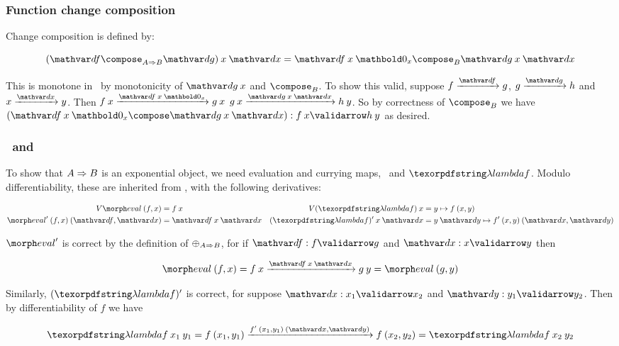 \subsubsection{Function change composition}

Change composition is defined by:

\nopagebreak[2]
\[ (\df \compose_{\expO A B} \dg) \<x \<\dx = \df \<x \<\zero_x \compose_B \dg \<x \<\dx\]

\noindent
This is monotone in \dx\ by monotonicity of $\dg\<x$ and $\composefn_B$. To show
this valid, suppose $\vld\df f g$, $\vld\dg g h$ and $\vld\dx x y$. Then
%
\(\vld{\df\<x\<\zero_x}{f\<x}{g\<x}\)
\(\vld{\dg\<x\<\dx}{g\<x}{h\<y} \).
%
\noindent So by correctness of $\composefn_B$ we have \(\valid{(\df\<x\<\zero_x
  \compose \dg\<x\<\dx)}{f\<x}{h\<y}\) as desired.


\subsubsection{\eval\ and \fn}

To show that $A \Rightarrow B$ is an exponential object, we need evaluation and
currying maps, \eval\ and $\fn f$. Modulo differentiability, these are
inherited from \Poset{}, with the following derivatives:

\begin{align*}
  \vals{\eval} \<(f,x) &= f\<x &
  \vals{(\fn f)} \<x &= y \mapsto f\<(x,y)\\
  \deriv{\eval} \<(f,x) \<(\df,\dx) &= \df \<x \<\dx &
  \deriv{(\fn f)} \<x \<\dx &= y\<\dy \mapsto \deriv f \<(x,y) \<(\dx,\dy)
\end{align*}

\noindent
$\deriv{\eval}$ is correct by the definition of ${\mathbin{\oplus}}_{A \Rightarrow B}$, for if
$\valid\df f g$ and $\valid\dx x y$ then

\nopagebreak[2]
\[ \eval\<(f,x) = {f\<x} \longvalidarrow{\df\<x\<\dx} {g\<y} = \eval\<(g,y) \]

\noindent
Similarly, \(\deriv{(\fn f)}\) is correct, for suppose $\valid\dx {x_1}{x_2}$
and $\valid\dy{y_1}{y_2}$. Then by differentiability of $f$ we have

\nopagebreak[2]
\[ \fn f \<x_1 \<y_1 =
f\<(x_1,y_1) \longvalidarrow{\deriv f \<(x_1,y_1) \<(\dx,\dy)} f\<(x_2,y_2)
= \fn f \<x_2 \<y_2
\]


